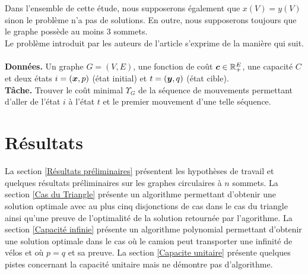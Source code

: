 Dans l'ensemble de cette étude, nous supposerons également que $x(V) = y(V)$ sinon le problème n'a pas de solutions. En outre, nous supposerons toujours que le graphe possède au moins 3 sommets.
\\

Le problème introduit par les auteurs de l'article \cite{Benchimol2011} s'exprime de la manière qui suit.
\\
\\
\textbf{Données.} Un graphe $G=(V,E)$, une fonction de coût $\boldsymbol{c} \in \mathbb{R}^E_+$, une capacité $C$ et deux états $i=(\boldsymbol{x},p)$ (état initial) et $t=(\boldsymbol{y},q)$ (état cible).
\\
\textbf{Tâche.} Trouver le coût minimal $\Upsilon_{G}$ de la séquence de mouvements permettant d'aller de l'état $i$ à l'état $t$ et le premier mouvement d'une telle séquence.

\section{Résultats}

La section \ref{Résultats préliminaires} présentent les hypothèses de travail et quelques résultats préliminaires sur les graphes circulaires à $n$ sommets. La section \ref{Cas du Triangle} présente un algorithme permettant d'obtenir une solution optimale avec au plus cinq disjonctions de cas dans le cas du triangle ainsi qu'une preuve de l'optimalité de la solution retournée par l'agorithme. La section \ref{Capacité infinie} présente un algorithme polynomial permettant d'obtenir une solution optimale dans le cas où le camion peut transporter une infinité de vélos et où $p=q$ et sa preuve. La section \ref{Capacite unitaire} présente quelques pistes concernant la capacité unitaire mais ne démontre pas d'algorithme.